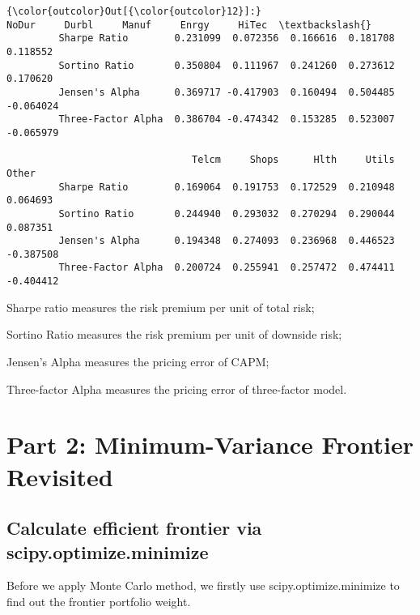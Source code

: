 \documentclass[11pt]{article}
\begin{document}
\begin{Verbatim}[commandchars=\\\{\}]
{\color{outcolor}Out[{\color{outcolor}12}]:}                        NoDur     Durbl     Manuf     Enrgy     HiTec  \textbackslash{}
         Sharpe Ratio        0.231099  0.072356  0.166616  0.181708  0.118552   
         Sortino Ratio       0.350804  0.111967  0.241260  0.273612  0.170620   
         Jensen's Alpha      0.369717 -0.417903  0.160494  0.504485 -0.064024   
         Three-Factor Alpha  0.386704 -0.474342  0.153285  0.523007 -0.065979   
         
                                Telcm     Shops      Hlth     Utils     Other  
         Sharpe Ratio        0.169064  0.191753  0.172529  0.210948  0.064693  
         Sortino Ratio       0.244940  0.293032  0.270294  0.290044  0.087351  
         Jensen's Alpha      0.194348  0.274093  0.236968  0.446523 -0.387508  
         Three-Factor Alpha  0.200724  0.255941  0.257472  0.474411 -0.404412  
\end{Verbatim}
            
    Sharpe ratio measures the risk premium per unit of total risk;

Sortino Ratio measures the risk premium per unit of downside risk;

Jensen's Alpha measures the pricing error of CAPM;

Three-factor Alpha measures the pricing error of three-factor model.

    \hypertarget{part-2-minimum-variance-frontier-revisited}{%
\section{Part 2: Minimum-Variance Frontier
Revisited}\label{part-2-minimum-variance-frontier-revisited}}

    \hypertarget{calculate-efficient-frontier-via-scipy.optimize.minimize}{%
\subsection{Calculate efficient frontier via
scipy.optimize.minimize}\label{calculate-efficient-frontier-via-scipy.optimize.minimize}}

    Before we apply Monte Carlo method, we firstly use
scipy.optimize.minimize to find out the frontier portfolio weight.
\end{document}
